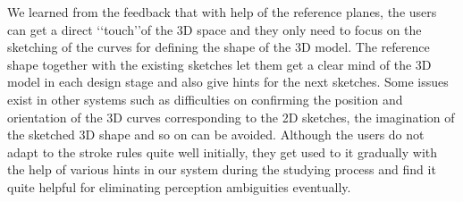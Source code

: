 We learned from the feedback that with help of the reference planes,
the users can get a direct \lq\lq{touch}\rq\rq of the 3D space and
they only need to focus on the sketching of the curves for defining
the shape of the 3D model. The reference shape together with the
existing sketches let them get a clear mind of the 3D model in each
design stage and also give hints for the next sketches. Some issues
exist in other systems such as difficulties on confirming the
position and orientation of the 3D curves corresponding to the 2D
sketches, the imagination of the sketched 3D shape and so on can be
avoided. Although the users do not adapt to the stroke rules quite
well initially, they get used to it gradually with the help of
various hints in our system during the studying process and find it
quite helpful for eliminating perception ambiguities eventually.




%
%
%
